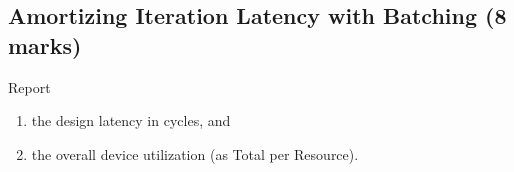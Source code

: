 \subsection{Amortizing Iteration Latency with Batching (8 marks)}

Report \begin{enumerate}
    \item the design latency in cycles, and
    \item the overall device utilization (as Total per Resource).
\end{enumerate}
